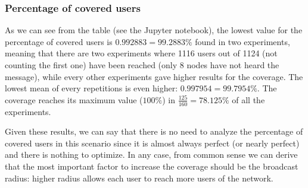 \subsubsection{Percentage of covered users}\label{subsubsec:hd2krcoverage}

As we can see from the table (see the Jupyter notebook), the lowest value for
the percentage of covered users is \(0.992883\!=\!99.2883\%\) found in two
experiments, meaning that there are two experiments where 1116 users out of
1124 (not counting the first one) have been reached (only 8 nodes have not heard
the message), while every other experiments gave higher results for the
coverage. The lowest mean of every repetitions is even higher:
\(0.997954\!=\!99.7954\%\). The coverage reaches its maximum value (\(100\%\))
in \(\frac{125}{160}\!=\!78.125\%\) of all the experiments.

Given these results, we can say that there is no need to analyze the percentage
of covered users in this scenario since it is almost always perfect (or nearly
perfect) and there is nothing to optimize. In any case, from common sense we can
derive that the most important factor to increase the coverage should be the
broadcast radius: higher radius allows each user to reach more users of the
network.
